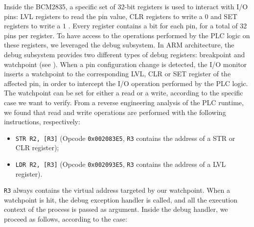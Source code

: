 Inside the BCM2835, a specific set of 32-bit registers is used to interact with I/O pins: LVL registers to read the pin value,
CLR registers to write a $0$ and SET registers to write a $1$ \cite{bcm2835}. Every register contains a bit for each pin, for a total of 32 pins per register.
To have access to the operations performed by the PLC logic on these registers, we leveraged the debug subsystem.
In ARM architecture, the debug subsystem provides two different types of debug registers: breakpoint and watchpoint (see ).
When a pin configuration change is detected, the I/O monitor inserts a watchpoint to the corresponding LVL, CLR or SET register of the affected pin,
in order to intercept the I/O operation performed by the PLC logic. The watchpoint can be set for either a read or a write, according to the specific case we want to verify.
From a reverse engineering analysis of the PLC runtime, we found that read and write operations are performed with the following instructions, respectively:
\begin{itemize}
	\item \verb|STR R2, [R3]| (Opcode \verb|0x002083E5|, \verb|R3| contains the address of a STR or CLR register);
	\item \verb|LDR R2, [R3]| (Opcode \verb|0x002093E5|, \verb|R3| contains the address of a LVL register).
\end{itemize}
\verb|R3| always contains the virtual address targeted by our watchpoint. When a watchpoint is hit, the debug exception handler is called,
and all the execution context of the process is passed as argument. Inside the debug handler, we proceed as follows, according to the case:
